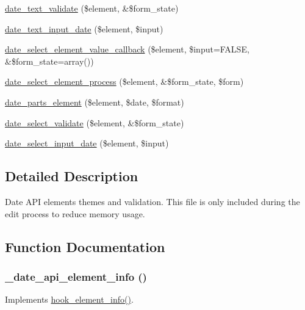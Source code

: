 \begin{DoxyCompactItemize}
\item 
\hyperlink{date__api__elements_8inc_aa6120a96cd6d04db4fe8e2ff15d39e68}{date\_\-text\_\-validate} (\$element, \&\$form\_\-state)
\item 
\hyperlink{date__api__elements_8inc_a7df91d2e64f95f23bffcb26de33d2ea8}{date\_\-text\_\-input\_\-date} (\$element, \$input)
\item 
\hyperlink{date__api__elements_8inc_a80a2f5d6b7eda94636af25ce4125142f}{date\_\-select\_\-element\_\-value\_\-callback} (\$element, \$input=FALSE, \&\$form\_\-state=array())
\item 
\hyperlink{date__api__elements_8inc_adabdb1eea05a7d11cb2108a18f01aeed}{date\_\-select\_\-element\_\-process} (\$element, \&\$form\_\-state, \$form)
\item 
\hyperlink{date__api__elements_8inc_a9d8d4e7d43727fc350dd30c42fc5fc10}{date\_\-parts\_\-element} (\$element, \$date, \$format)
\item 
\hyperlink{date__api__elements_8inc_ab2b275d606ded86988e421c9e17d4f6d}{date\_\-select\_\-validate} (\$element, \&\$form\_\-state)
\item 
\hyperlink{date__api__elements_8inc_a80414f7f53d30346edcbe82f8ad5b69c}{date\_\-select\_\-input\_\-date} (\$element, \$input)
\end{DoxyCompactItemize}


\subsection{Detailed Description}
Date API elements themes and validation. This file is only included during the edit process to reduce memory usage. 

\subsection{Function Documentation}
\hypertarget{date__api__elements_8inc_aeffcad67abcab341ed4617c76a59df43}{
\subsubsection[{\_\-date\_\-api\_\-element\_\-info}]{\setlength{\rightskip}{0pt plus 5cm}\_\-date\_\-api\_\-element\_\-info ()}}
\label{date__api__elements_8inc_aeffcad67abcab341ed4617c76a59df43}
Implements \hyperlink{group__hooks_ga3c5182432eddc82f8b7845e66a365d51}{hook\_\-element\_\-info()}.

